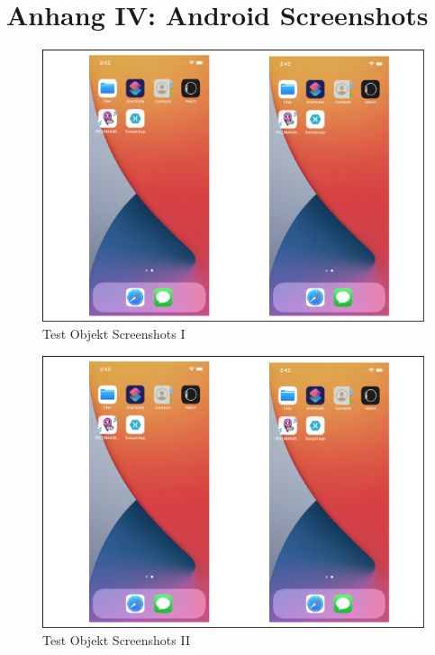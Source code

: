 \chapter{Anhang IV: Android Screenshots}
\label{chap:AnhangAndroidScreenshots}


\begin{figure}[!ht]
 \includegraphics[width=\textwidth,keepaspectratio]{Images/Screenshot/AppIconAndMenu.png}
 \caption[]{Test Objekt Screenshots I}
\end{figure}

\begin{figure}[!ht]
 \includegraphics[width=\textwidth,keepaspectratio]{Images/Screenshot/AppIconAndMenu.png}
 \caption[]{Test Objekt Screenshots II}
\end{figure}

